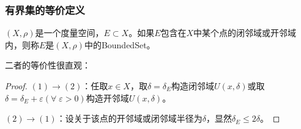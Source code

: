 \subsubsection{有界集的等价定义}
\begin{definition}\label{def:BoundedSet2}
	$(X,\rho)$是一个度量空间，$E\subset X$。如果$E$包含在$X$中某个点的闭邻域或开邻域内，则称$E$是$(X,\rho)$中的\gls{BoundedSet}。
\end{definition}
二者的等价性很直观：
\begin{proof}
	$(1)\to(2)$：任取$x\in X$，取$\delta=\delta_E$构造闭邻域$U(x,\delta)$或取$\delta=\delta_E+\varepsilon(\forall\;\varepsilon>0)$构造开邻域$U(x,\delta)$。\par
	$(2)\to(1)$：设关于该点的开邻域或闭邻域半径为$\delta$，显然$\delta_E\leqslant 2\delta$。
\end{proof}
